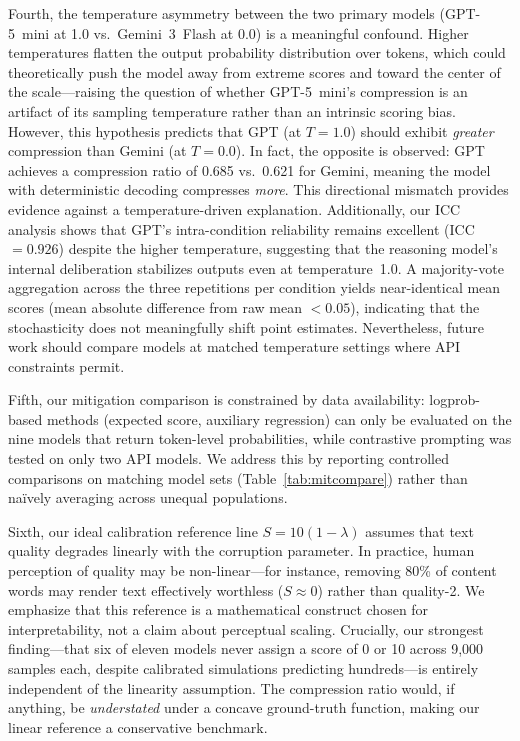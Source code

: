 \documentclass[11pt]{article}
\begin{document}
Fourth, the temperature asymmetry between the two primary models (GPT-5~mini at 1.0 vs.\ Gemini~3~Flash at 0.0) is a meaningful confound. Higher temperatures flatten the output probability distribution over tokens, which could theoretically push the model away from extreme scores and toward the center of the scale---raising the question of whether GPT-5~mini's compression is an artifact of its sampling temperature rather than an intrinsic scoring bias. However, this hypothesis predicts that GPT (at $T = 1.0$) should exhibit \emph{greater} compression than Gemini (at $T = 0.0$). In fact, the opposite is observed: GPT achieves a compression ratio of 0.685 vs.\ 0.621 for Gemini, meaning the model with deterministic decoding compresses \emph{more}. This directional mismatch provides evidence against a temperature-driven explanation. Additionally, our ICC analysis shows that GPT's intra-condition reliability remains excellent (ICC $= 0.926$) despite the higher temperature, suggesting that the reasoning model's internal deliberation stabilizes outputs even at temperature~1.0. A majority-vote aggregation across the three repetitions per condition yields near-identical mean scores (mean absolute difference from raw mean $< 0.05$), indicating that the stochasticity does not meaningfully shift point estimates. Nevertheless, future work should compare models at matched temperature settings where API constraints permit.

Fifth, our mitigation comparison is constrained by data availability: logprob-based methods (expected score, auxiliary regression) can only be evaluated on the nine models that return token-level probabilities, while contrastive prompting was tested on only two API models. We address this by reporting controlled comparisons on matching model sets (Table~\ref{tab:mitcompare}) rather than na\"ively averaging across unequal populations.

Sixth, our ideal calibration reference line $S = 10(1 - \lambda)$ assumes that text quality degrades linearly with the corruption parameter. In practice, human perception of quality may be non-linear---for instance, removing 80\% of content words may render text effectively worthless ($S \approx 0$) rather than quality-2. We emphasize that this reference is a mathematical construct chosen for interpretability, not a claim about perceptual scaling. Crucially, our strongest finding---that six of eleven models never assign a score of 0 or 10 across 9{,}000 samples each, despite calibrated simulations predicting hundreds---is entirely independent of the linearity assumption. The compression ratio would, if anything, be \emph{understated} under a concave ground-truth function, making our linear reference a conservative benchmark.
\end{document}
